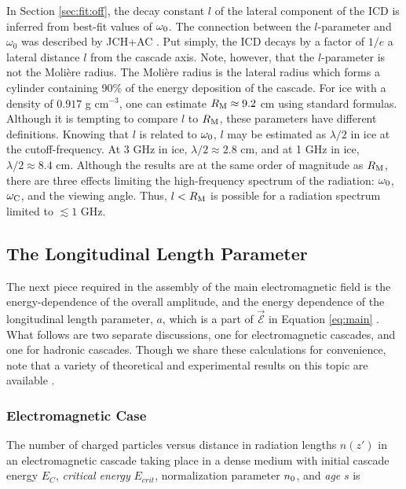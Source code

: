 \documentclass[amsmath,amssymb,aps,prd,10pt,twocolumn]{revtex4}
\begin{document}
In Section \ref{sec:fit:off}, the decay constant $l$ of the lateral component of the ICD is inferred from best-fit values of $\omega_{\rm 0}$.  The connection between the $l$-parameter and $\omega_0$ was described by JCH+AC \cite{10.1016/j.astropartphys.2017.03.008}.  Put simply, the ICD decays by a factor of $1/e$ a lateral distance $l$ from the cascade axis.  Note, however, that the $l$-parameter is not the Moli\`{e}re radius.  The Moli\`{e}re radius is the lateral radius which forms a cylinder containing 90\% of the energy deposition of the cascade.  For ice with a density of $0.917$ g cm$^{-3}$, one can estimate $R_{\rm M} \approx 9.2$ cm using standard formulas.  Although it is tempting to compare $l$ to $R_{\rm M}$, these parameters have different definitions. Knowing that $l$ is related to $\omega_{\rm 0}$, $l$ may be estimated as $\lambda/2$ in ice at the cutoff-frequency.  At 3 GHz in ice, $\lambda/2 \approx 2.8$ cm, and at 1 GHz in ice, $\lambda/2 \approx 8.4$ cm.  Although the results are at the same order of magnitude as $R_{\rm M}$, there are three effects limiting the high-frequency spectrum of the radiation: $\omega_{\rm 0}$, $\omega_{\rm C}$, and the viewing angle.  Thus, $l < R_{\rm M}$ is possible for a radiation spectrum limited to $\lesssim 1$ GHz.  

\subsection{The Longitudinal Length Parameter}
\label{sec:ff2}

The next piece required in the assembly of the main electromagnetic field is the energy-dependence of the overall amplitude, and the energy dependence of the longitudinal length parameter, $a$, which is a part of $\vec{\mathcal{E}}$ in Equation \ref{eq:main} \cite{10.1103/physrevd.65.016003}.  What follows are two separate discussions, one for electromagnetic cascades, and one for hadronic cascades.  Though we share these calculations for convenience, note that a variety of theoretical and experimental results on this topic are available \cite{saltzberg} \cite{ANDRINGA2011360} \cite{10.1088/1742-6596/1879/3/032089}.  

\subsubsection{Electromagnetic Case}

The number of charged particles versus distance in radiation lengths $n(z')$ in an electromagnetic cascade taking place in a dense medium with initial cascade energy $E_C$, \textit{critical energy} $E_{crit}$, normalization parameter $n_{\rm 0}$, and \textit{age} $s$ is \cite{10.1016/j.astropartphys.2017.03.008}
\end{document}
